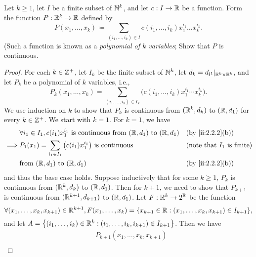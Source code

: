 \begin{ex}\label{ii:ex:2.2.7}
  Let \(k \geq 1\), let \(I\) be a finite subset of \(\mathbb{N}^k\), and let \(c : I \to \mathbb{R}\) be a function.
  Form the function \(P : \mathbb{R}^k \to \mathbb{R}\) defined by
  \[
    P(x_1, \dots, x_k) \coloneqq \sum_{(i_1, \dots, i_k) \in I} c(i_1, \dots, i_k) x_1^{i_1} \dots x_k^{i_k}.
  \]
  (Such a function is known as a \emph{polynomial of \(k\) variables};
  Show that \(P\) is continuous.
\end{ex}

\begin{proof}
  For each \(k \in \mathbb{Z}^+\), let \(I_k\) be the finite subset of \(\mathbb{N}^k\), let \(d_k = d_{l^1}|_{\mathbb{R}^k \times \mathbb{R}^k}\), and let \(P_k\) be a polynomial of \(k\) variables, i.e.,
  \[
    P_k(x_1, \dots, x_k) = \sum_{(i_1, \dots, i_k) \in I_k} \big(c(i_1, \dots, i_k) x_1^{i_1} \cdots x_k^{i_k}\big).
  \]
  We use induction on \(k\) to show that \(P_k\) is continuous from \((\mathbb{R}^k, d_k)\) to \((\mathbb{R}, d_1)\) for every \(k \in \mathbb{Z}^+\).
  We start with \(k = 1\).
  For \(k = 1\), we have
  \begin{align*}
             & \forall i_1 \in I_1, c(i_1) x_1^{i_1} \text{ is continuous from } (\R, d_1) \text{ to } (\R, d_1) &  & \by{ii:2.2.2}[b]                        \\
    \implies & P_1(x_1) = \sum_{i_1 \in I_1} \big(c(i_1) x_1^{i_1}\big) \text{ is continuous}                    &  & \text{(note that \(I_1\) is finite)} \\
             & \text{from } (\R, d_1) \text{ to } (\R, d_1)                                                      &  & \by{ii:2.2.2}[b]
  \end{align*}
  and thus the base case holds.
  Suppose inductively that for some \(k \geq 1\), \(P_k\) is continuous from \((\mathbb{R}^k, d_k)\) to \((\mathbb{R}, d_1)\).
  Then for \(k + 1\), we need to show that \(P_{k + 1}\) is continuous from \((\mathbb{R}^{k + 1}, d_{k + 1})\) to \((\mathbb{R}, d_1)\).
  Let \(F : \mathbb{R}^k \to 2^{\mathbb{R}}\) be the function
  \[
    \forall (x_1, \dots, x_k, x_{k + 1}) \in \R^{k + 1}, F(x_1, \dots, x_k) = \set{x_{k + 1} \in \R : (x_1, \dots, x_k, x_{k + 1}) \in I_{k + 1}},
  \]
  and let \(A = \left\lbrace(i_1, \dots, i_k) \in \mathbb{R}^k : (i_1, \dots, i_k, i_{k + 1}) \in I_{k + 1}\right\rbrace\).
  Then we have
  \begin{align*}
     & P_{k + 1}(x_1, \dots, x_k, x_{k + 1})                                                                                                                                                                        \\

\end{align*}
\end{proof}
